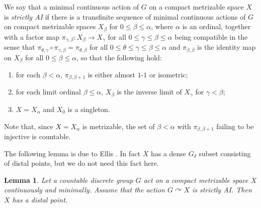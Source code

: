 \documentclass[11pt]{amsart}
\newtheorem{lemma}[theorem]{Lemma}
\theoremstyle{definition}
\numberwithin{equation}{section}
\theoremstyle{definition}
\begin{document}
We say that a minimal continuous action of $G$ on a compact metrizable space $X$ is {\it strictly AI} \cite[Remark VI.4.17.2]{deVries} if there is a transfinite sequence of  minimal continuous actions of $G$ on compact metrizable spaces $X_\beta$ for $0\le \beta\le \alpha$, where $\alpha$ is an ordinal, together with a factor map $\pi_{\gamma, \beta}: X_\beta\rightarrow X_\gamma$ for all $0\le \gamma\le \beta\le \alpha$ being compatible in the sense that $\pi_{\theta, \gamma}\circ \pi_{\gamma, \beta}=\pi_{\theta, \beta}$ for all $0\le \theta\le \gamma\le \beta\le \alpha$ and $\pi_{\beta, \beta}$ is the identity map on $X_\beta$ for all $0\le \beta\le \alpha$, so that the following hold:
\begin{enumerate}
\item for each $\beta<\alpha$, $\pi_{\beta, \beta+1}$ is either almost $1$-$1$ or isometric;
\item for each limit ordinal $\beta\le \alpha$, $X_\beta$ is the inverse limit of $X_\gamma$ for $\gamma<\beta$;
\item $X=X_\alpha$ and $X_0$ is a singleton. 
\end{enumerate} 
Note that, since $X=X_\alpha$ is metrizable, the set of $\beta<\alpha$ with $\pi_{\beta, \beta+1}$ failing to be injective is countable.  

The following lemma is due to Ellis \cite{Ellis73} \cite[VI.6.4.6]{deVries}. In fact $X$ has a dense $G_\delta$ subset consisting of distal points, but we do not need this fact here. 

\begin{lemma} \label{L-strictly AI are point-distal}
Let a countable discrete group $G$ act on  a compact metrizable space $X$ continuously and minimally. Assume that the action $G\curvearrowright X$ is strictly AI. Then $X$ has a distal point. 
\end{lemma}
\end{document}

